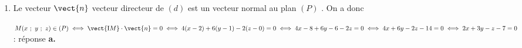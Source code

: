 \begin{enumerate}
$\bullet~~$Les deux droites sont sécantes s'il existe deux réels $t$ et $k$ tels que :

$\left\{\begin{array}{l c l}
3 + 4t&=&- 2 + 3k\\
6t&=&- 1 - 2k\\
4 - 2t&=&1 + k
\end{array}\right. \iff \left\{\begin{array}{l c l}
4t&=&3k - 5\\6t&=&- 2k - 1\\
- 2t&=&k - 3\end{array}\right.$

Par différence de la ligne 1 et de la ligne 2, on obtient$ -2t = 5k - 4 = k - 3$ (ligne 3) soit $4k = 1 \iff k = \dfrac14$, puis comme $- 2t = k - 3 = \dfrac14 - 3 = - \dfrac{11}{4}$, d'où $t = \dfrac{11}{8}$, mais la première ligne donne $4t = 3k - 5 = \dfrac34 - 5 = - \dfrac{17}{4}$, d'où $t = \dfrac{17}{8}$ : ceci n'est pas possible : les deux droites ne sont pas sécantes.

$\bullet~~$Les deux droites ne sont pas confondues : il reste la réponse \textbf{b.}

\item  %

%
Le vecteur $\vect{n}$ vecteur directeur de $(d)$ est un vecteur normal au plan $(P)$ . On a donc 

$M(x~;~y~;~z) \in (P) \iff \vect{\text{I}M} \cdot \vect{n} = 0 \iff 4(x - 2) + 6(y - 1) - 2(z - 0) = 0 \iff 4x - 8 + 6y - 6 - 2z = 0 \iff 4x + 6y -2z - 14 = 0 \iff 2x + 3y - z - 7 = 0$ : réponse \textbf{a.}
\end{enumerate}

\bigskip


